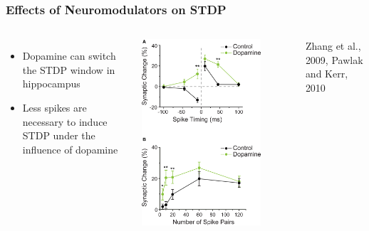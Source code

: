 \documentclass{beamer}
\begin{document}
\begin{frame}
\frametitle{Effects of Neuromodulators on STDP}
    \begin{columns}[T]
    

    \begin{itemize}
        \item Dopamine can switch the STDP window in hippocampus
        \item Less spikes are necessary to induce STDP under the influence of dopamine 
    \end{itemize}

    \includegraphics[width=0.8\textwidth]{./figures/dopa_switch}

    \tiny{Zhang et al., 2009, Pawlak and Kerr, 2010}

  \end{columns}

\end{frame}
\end{document}
